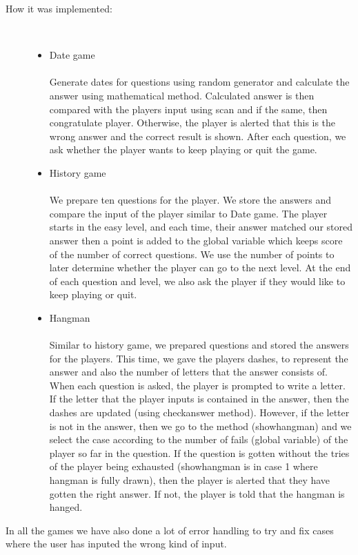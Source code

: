 \documentclass[11pt]{article}
\begin{document}
\begin{description}
 \item[How it was implemented:] \hfill \\
        \begin{itemize}
            \item Date game \\\\
            Generate dates for questions using random generator and calculate
            the answer using mathematical method. Calculated answer is then
            compared with the players input using scan and if the same, then
            congratulate player. Otherwise, the player is alerted that this
            is the wrong answer and the correct result is shown. After each
            question, we ask whether the player wants to keep playing or quit
            the game.\\
            \item History game \\\\
            We prepare ten questions for the player. We store the answers and
            compare the input of the player similar to Date game. The player
            starts in the easy level, and each time, their answer matched our
            stored answer then a point is added to the global variable which
            keeps score of the number of correct questions. We use the number
            of points to later determine whether the player can go to the next
            level. At the end of each question and level, we also ask the player
             if they would like to keep playing or quit.\\
            \item Hangman \\\\
            Similar to history game, we prepared questions and stored the
            answers for the players. This time, we gave the players dashes, to
            represent the answer and also the number of letters that the answer
            consists of. When each question is asked, the player is prompted to
            write a letter.  If the letter that the player inputs is contained
            in the answer, then the dashes are updated (using checkanswer
            method). However, if the letter is not in the answer, then we go to
             the method (showhangman) and we select the case according to the
              number of fails (global variable) of the player so far in the
              question. If the question is gotten without the tries of the
              player being exhausted (showhangman is in case 1 where hangman is
               fully drawn), then the player is alerted that they have gotten
               the right answer. If not, the player is told that the hangman is
                hanged. \\
        \end{itemize}
    \end{description}
    In all the games we have also done a lot of error handling to try and fix
    cases where the user has inputed the wrong kind of input. \\
\end{document}
